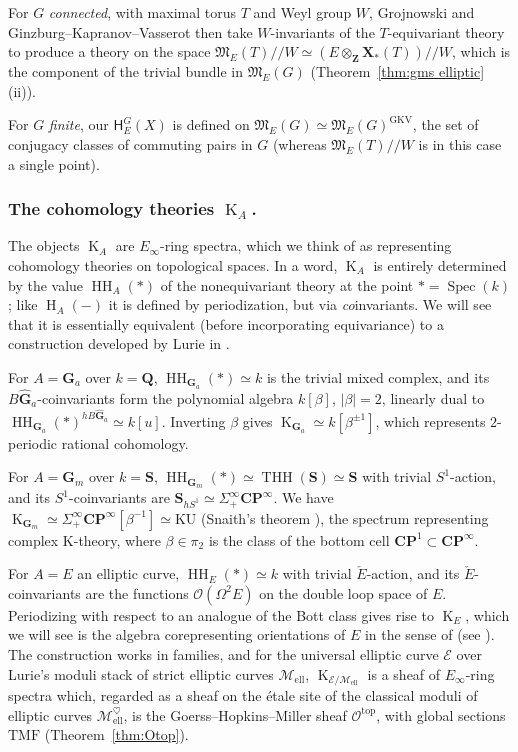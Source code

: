 \documentclass[12pt, oneside]{amsart}
\numberwithin{equation}{section}
\theoremstyle{remark}
\theoremstyle{plain}
\newcommand{\frM}{\mathfrak{M}}
\newcommand{\OO}{\mathcal{O}}
\DeclareMathOperator{\spc}{Spec}
\newcommand{\modmod}{/\!\!/}
\newcommand{\GGhat}{\widehat{\mathbf{G}}}
\newcommand{\GGa}{\mathbf{G}_{a}}
\newcommand{\GGm}{\mathbf{G}_{m}}
\newcommand{\bZ}{\mathbf{Z}}
\newcommand{\bQ}{\mathbf{Q}}
\newcommand{\HH}{\operatorname{HH}}
\newcommand{\Hcoh}{\operatorname{H}}
\newcommand{\K}{\operatorname{K}}
\newcommand{\Mell}{\mathcal{M}_{\mathrm{ell}}}
\begin{document}
For $G$ \emph{connected}, with maximal torus $T$ and Weyl group $W$, Grojnowski \cite[\S 2.6]{Gr} and Ginzburg--Kapranov--Vasserot \cite[(1.11)]{GKV} then take $W$-invariants of the $T$-equivariant theory to produce a theory on the space $\frM_E(T) \modmod W \simeq (E \otimes_{\bZ} \mathbf{X}_*(T)) \modmod W$, which is the component of the trivial bundle in $\frM_E(G)$ (Theorem~\ref{thm:gms elliptic}(ii)).

For $G$ \emph{finite}, our $\mathsf{H}_E^G(X)$ is defined on $\frM_E(G) \simeq \frM_E(G)^{\mathrm{GKV}}$, the set of conjugacy classes of commuting pairs in $G$ (whereas $\frM_E(T) \modmod W$ is in this case a single point).

\subsubsection{The cohomology theories $\K_A$.}

The objects $\K_A$ are $E_\infty$-ring spectra, which we think of as representing cohomology theories on topological spaces.
In a word, $\K_A$ is entirely determined by the value $\HH_A(*)$ of the nonequivariant theory at the point $*=\spc(k)$; like $\Hcoh_A(-)$ it is defined by periodization, but via \emph{co}invariants.
We will see that it is essentially equivalent (before incorporating equivariance) to a construction developed by Lurie in \cite[\S 4.3]{LurieEll2}.

For $A=\GGa$ over $k=\bQ$, $\HH_{\GGa}(*) \simeq k$ is the trivial mixed complex, and its $B\GGhat_a$-coinvariants form the polynomial algebra $k[\beta]$, $|\beta|=2$, linearly dual to $\HH_{\GGa}(*)^{hB\GGhat_a} \simeq k[u]$.
Inverting $\beta$ gives $\K_{\GGa} \simeq k[\beta^{\pm 1}]$, which represents $2$-periodic rational cohomology.

For $A=\GGm$ over $k=\mathbf{S}$, $\HH_{\GGm}(*) \simeq \operatorname{THH}(\mathbf{S}) \simeq \mathbf{S}$ with trivial $S^1$-action, and its $S^1$-coinvariants are $\mathbf{S}_{hS^1} \simeq \Sigma^\infty_+\mathbf{C}\mathbf{P}^\infty$.
We have $\K_{\GGm} \simeq \Sigma^\infty_+\mathbf{C}\mathbf{P}^\infty[\beta^{-1}] \simeq \mathrm{KU}$ (Snaith's theorem \cite{Snaith}), the spectrum representing complex K-theory, where $\beta \in \pi_2$ is the class of the bottom cell $\mathbf{C}\mathbf{P}^1 \subset \mathbf{C}\mathbf{P}^\infty$.

For $A=E$ an elliptic curve, $\HH_E(*) \simeq k$ with trivial $\check{E}$-action, and its $\check{E}$-coinvariants are the functions $\OO(\Omega^2 E)$ on the double loop space of $E$.
Periodizing with respect to an analogue of the Bott class gives rise to $\K_E$, which we will see is the algebra corepresenting orientations of $E$ in the sense of \cite[Def.~7.2.7]{LurieEll2} (see \cite[\S 4.3, \S 7.2]{LurieEll2}).
The construction works in families, and for the universal elliptic curve $\mathcal{E}$ over Lurie's moduli stack of strict elliptic curves $\Mell$, $\K_{\mathcal{E}/\Mell}$ is a sheaf of $E_\infty$-ring spectra which, regarded as a sheaf on the étale site of the classical moduli of elliptic curves $\Mell^{\heartsuit}$, is the Goerss--Hopkins--Miller sheaf $\OO^{\mathrm{top}}$, with global sections $\mathrm{TMF}$ (Theorem~\ref{thm:Otop}).
\end{document}

